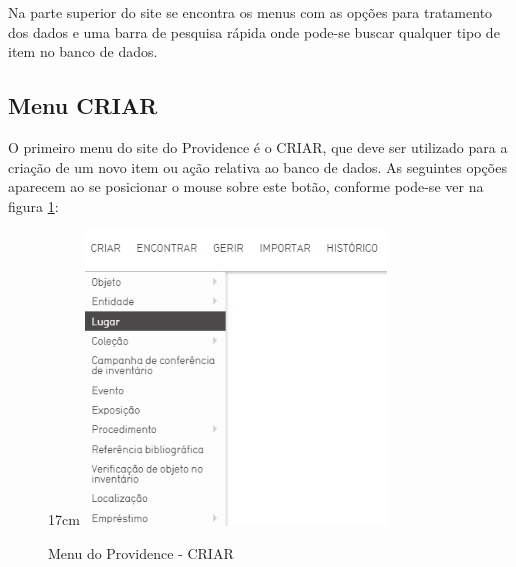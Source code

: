 \documentclass[a4paper,12pt,oneside,onecolumn,final,fleqn]{repUERJ}
\begin{document}
Na parte superior do site se encontra os menus com as opções para tratamento dos dados e uma barra de pesquisa rápida onde pode-se buscar qualquer tipo de item no banco de dados.

\subsection{Menu CRIAR}

O primeiro menu do site do Providence é o CRIAR, que deve ser utilizado para a criação de um novo item ou ação relativa ao banco de dados. As seguintes opções aparecem ao se posicionar o mouse sobre este botão, conforme pode-se ver na figura \ref{fig:menu_criar}:

\begin{figure}[!ht]{17cm}
	\includegraphics[width=8cm, center]{figuras/menu_criar.jpg}
	\caption{Menu do Providence - CRIAR} \label{fig:menu_criar}
\end{figure}
\end{document}
